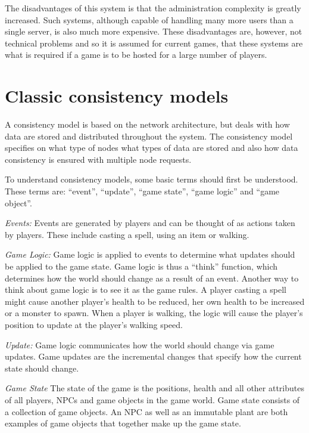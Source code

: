 \documentclass[10pt,a4paper,journal,cspaper,compsoc]{IEEEtran}
\begin{document}
The disadvantages of this system is that the administration complexity is greatly increased. Such systems, although capable of handling many more
users than a single server, is also much more expensive. These disadvantages are, however, not technical problems and so it is assumed for current
games, that these systems are what is required if a game is to be hosted for a large number of players.

\section{Classic consistency models}
\label{classic_models}

A consistency model is based on the network architecture, but deals with how data are stored and distributed throughout the system. The consistency
model specifies on what type of nodes what types of data are stored and also how data consistency is ensured with multiple node requests.

To understand consistency models, some basic terms should first be understood. These terms are: ``event'', ``update'', ``game state'', ``game logic''
and ``game object''.

\emph{Events:} Events are generated by players and can be thought of as actions taken by players. These include casting a spell, using an item
    or walking.

\emph{Game Logic:} Game logic is applied to events to determine what updates should be applied to the game state. Game logic is thus a
    ``think'' function, which determines how the world should change as a result of an event. Another way to think about game logic is to see
    it as the game rules. A player casting a spell might cause another player's health to be reduced, her own health to be increased or a
    monster to spawn. When a player is walking, the logic will cause the player's position to update at the player's walking speed.

\emph{Update:} Game logic communicates how the world should change via game updates. Game updates are the incremental changes that specify how
    the current state should change.

\emph{Game State} The state of the game is the positions, health and all other attributes of all players, NPCs and game objects in the game
    world. Game state consists of a collection of game objects. An NPC as well as an immutable plant are both examples of game objects that
    together make up the game state.
\end{document}
